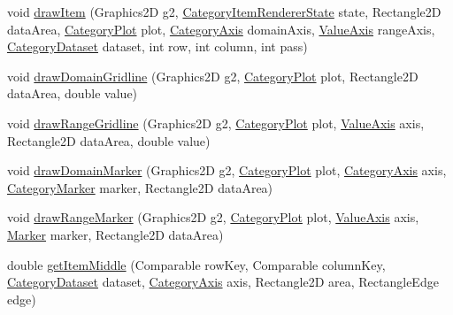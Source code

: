 \begin{DoxyCompactItemize}
\item 
void \mbox{\hyperlink{interfaceorg_1_1jfree_1_1chart_1_1renderer_1_1category_1_1_category_item_renderer_ac18a046a47d2b991ab2c968ce3363aea}{draw\+Item}} (Graphics2D g2, \mbox{\hyperlink{classorg_1_1jfree_1_1chart_1_1renderer_1_1category_1_1_category_item_renderer_state}{Category\+Item\+Renderer\+State}} state, Rectangle2D data\+Area, \mbox{\hyperlink{classorg_1_1jfree_1_1chart_1_1plot_1_1_category_plot}{Category\+Plot}} plot, \mbox{\hyperlink{classorg_1_1jfree_1_1chart_1_1axis_1_1_category_axis}{Category\+Axis}} domain\+Axis, \mbox{\hyperlink{classorg_1_1jfree_1_1chart_1_1axis_1_1_value_axis}{Value\+Axis}} range\+Axis, \mbox{\hyperlink{interfaceorg_1_1jfree_1_1data_1_1category_1_1_category_dataset}{Category\+Dataset}} dataset, int row, int column, int pass)
\item 
void \mbox{\hyperlink{interfaceorg_1_1jfree_1_1chart_1_1renderer_1_1category_1_1_category_item_renderer_a662bed2e8c321863a5aaed9d23e17a36}{draw\+Domain\+Gridline}} (Graphics2D g2, \mbox{\hyperlink{classorg_1_1jfree_1_1chart_1_1plot_1_1_category_plot}{Category\+Plot}} plot, Rectangle2D data\+Area, double value)
\item 
void \mbox{\hyperlink{interfaceorg_1_1jfree_1_1chart_1_1renderer_1_1category_1_1_category_item_renderer_ac0e4384b40cf356acd53c1ca261c5fa8}{draw\+Range\+Gridline}} (Graphics2D g2, \mbox{\hyperlink{classorg_1_1jfree_1_1chart_1_1plot_1_1_category_plot}{Category\+Plot}} plot, \mbox{\hyperlink{classorg_1_1jfree_1_1chart_1_1axis_1_1_value_axis}{Value\+Axis}} axis, Rectangle2D data\+Area, double value)
\item 
void \mbox{\hyperlink{interfaceorg_1_1jfree_1_1chart_1_1renderer_1_1category_1_1_category_item_renderer_a1e25645252b69192d2c15bc31266b144}{draw\+Domain\+Marker}} (Graphics2D g2, \mbox{\hyperlink{classorg_1_1jfree_1_1chart_1_1plot_1_1_category_plot}{Category\+Plot}} plot, \mbox{\hyperlink{classorg_1_1jfree_1_1chart_1_1axis_1_1_category_axis}{Category\+Axis}} axis, \mbox{\hyperlink{classorg_1_1jfree_1_1chart_1_1plot_1_1_category_marker}{Category\+Marker}} marker, Rectangle2D data\+Area)
\item 
void \mbox{\hyperlink{interfaceorg_1_1jfree_1_1chart_1_1renderer_1_1category_1_1_category_item_renderer_a5dae81a98a7bfe3e3c68bef3d8e7b225}{draw\+Range\+Marker}} (Graphics2D g2, \mbox{\hyperlink{classorg_1_1jfree_1_1chart_1_1plot_1_1_category_plot}{Category\+Plot}} plot, \mbox{\hyperlink{classorg_1_1jfree_1_1chart_1_1axis_1_1_value_axis}{Value\+Axis}} axis, \mbox{\hyperlink{classorg_1_1jfree_1_1chart_1_1plot_1_1_marker}{Marker}} marker, Rectangle2D data\+Area)
\item 
double \mbox{\hyperlink{interfaceorg_1_1jfree_1_1chart_1_1renderer_1_1category_1_1_category_item_renderer_aa3893e60f96a542d2fefe6ae76e47964}{get\+Item\+Middle}} (Comparable row\+Key, Comparable column\+Key, \mbox{\hyperlink{interfaceorg_1_1jfree_1_1data_1_1category_1_1_category_dataset}{Category\+Dataset}} dataset, \mbox{\hyperlink{classorg_1_1jfree_1_1chart_1_1axis_1_1_category_axis}{Category\+Axis}} axis, Rectangle2D area, Rectangle\+Edge edge)
\end{DoxyCompactItemize}


